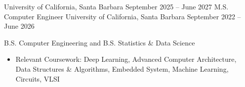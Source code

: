 \documentclass[9pt]{developercv} %
\begin{document}
\vspace{-10 pt}
\begin{entrylist}

\vspace{-5pt}

    \entry
    {}
    {University of California, Santa Barbara}
    {September 2025 – June 2027}
    {M.S. Computer Engineer}
    \entry
    {}
    {University of California, Santa Barbara}
    {September 2022 – June 2026}
    {B.S. Computer Engineering and B.S. Statistics \& Data Science
    \begin{itemize}[noitemsep,topsep=0pt,parsep=0pt,partopsep=0pt, leftmargin=10pt]
        \item Relevant Coursework: Deep Learning, Advanced Computer Architecture, Data Structures \& Algorithms, Embedded System, Machine Learning, Circuits, VLSI
    \end{itemize}}



\end{entrylist}
\end{document}
